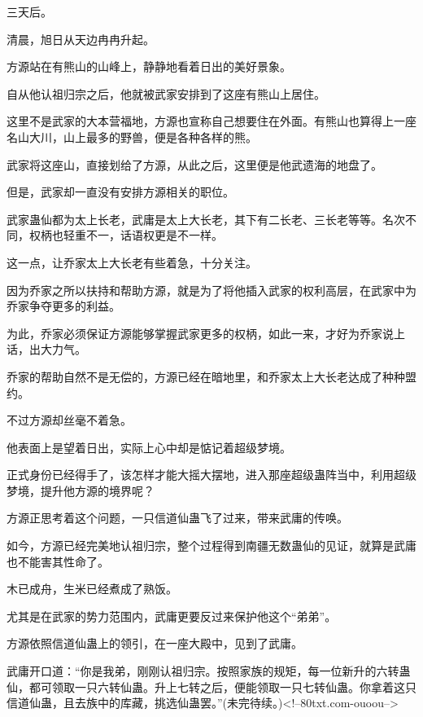 \begin{this_body}
三天后。

清晨，旭日从天边冉冉升起。

方源站在有熊山的山峰上，静静地看着日出的美好景象。

自从他认祖归宗之后，他就被武家安排到了这座有熊山上居住。

这里不是武家的大本营福地，方源也宣称自己想要住在外面。有熊山也算得上一座名山大川，山上最多的野兽，便是各种各样的熊。

武家将这座山，直接划给了方源，从此之后，这里便是他武遗海的地盘了。

但是，武家却一直没有安排方源相关的职位。

武家蛊仙都为太上长老，武庸是太上大长老，其下有二长老、三长老等等。名次不同，权柄也轻重不一，话语权更是不一样。

这一点，让乔家太上大长老有些着急，十分关注。

因为乔家之所以扶持和帮助方源，就是为了将他插入武家的权利高层，在武家中为乔家争夺更多的利益。

为此，乔家必须保证方源能够掌握武家更多的权柄，如此一来，才好为乔家说上话，出大力气。

乔家的帮助自然不是无偿的，方源已经在暗地里，和乔家太上大长老达成了种种盟约。

不过方源却丝毫不着急。

他表面上是望着日出，实际上心中却是惦记着超级梦境。

正式身份已经得手了，该怎样才能大摇大摆地，进入那座超级蛊阵当中，利用超级梦境，提升他方源的境界呢？

方源正思考着这个问题，一只信道仙蛊飞了过来，带来武庸的传唤。

如今，方源已经完美地认祖归宗，整个过程得到南疆无数蛊仙的见证，就算是武庸也不能害其性命了。

木已成舟，生米已经煮成了熟饭。

尤其是在武家的势力范围内，武庸更要反过来保护他这个“弟弟”。

方源依照信道仙蛊上的领引，在一座大殿中，见到了武庸。

武庸开口道：“你是我弟，刚刚认祖归宗。按照家族的规矩，每一位新升的六转蛊仙，都可领取一只六转仙蛊。升上七转之后，便能领取一只七转仙蛊。你拿着这只信道仙蛊，且去族中的库藏，挑选仙蛊罢。”(未完待续。)<!--80txt.com-ouoou-->

\end{this_body}

